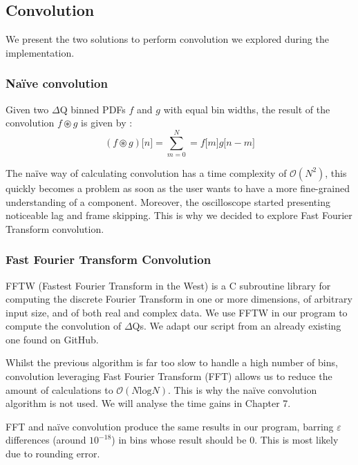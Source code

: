     \subsection{Convolution} \label{convol}
    We present the two solutions to perform convolution we explored during the implementation.  
        \subsubsection{Naïve convolution}
        Given two $\Delta$Q binned PDFs $f$ and $g$ with equal bin widths, the result of the convolution $f \circledast g$ is given by \cite{conv}: 
        \begin{equation}
            (f \circledast g)\lbrack n \rbrack = \sum_{m = 0}^{N} = f\lbrack m \rbrack g \lbrack n - m \rbrack  
            \label{eq:discconv}
        \end{equation}

        The naïve way of calculating convolution has a time complexity of $\mathcal{O}(N^2)$, this quickly becomes a problem as soon as the user wants to have a more fine-grained understanding of a component. Moreover, the oscilloscope started presenting noticeable lag and frame skipping. This is why we decided to explore Fast Fourier Transform convolution. 
 
    \subsubsection{Fast Fourier Transform Convolution}
        FFTW (Fastest Fourier Transform in the West) is a C subroutine library \cite{fftw3} for computing the discrete Fourier Transform in one or more dimensions, of arbitrary input size, and of both real and complex data. We use FFTW in our program to compute the convolution of $\Delta$Qs. We adapt our script from an already existing one found on GitHub. \cite{fft}
    
    Whilst the previous algorithm is far too slow to handle a high number of bins, convolution leveraging Fast Fourier Transform (FFT) allows us to reduce the amount of calculations to $\mathcal{O}(N \text{log} N)$. This is why the naïve convolution algorithm is not used. We will analyse the time gains in Chapter 7.
    
    FFT and naïve convolution produce the same results in our program, barring $\varepsilon$ differences (around $10^{-18}$) in bins whose result should be 0. This is most likely due to rounding error.
    
